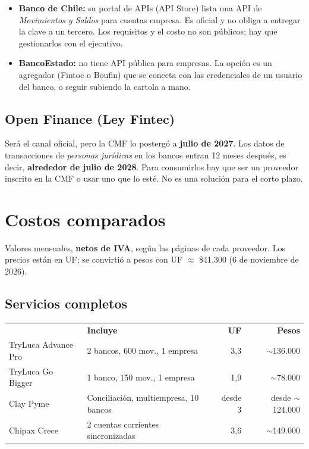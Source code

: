 \documentclass[11pt,a4paper]{article}
\newcommand{\tablahead}[1]{{\color{white}\sffamily\bfseries #1}}
\begin{document}
\begin{itemize}
  \item \textbf{Banco de Chile:} su portal de APIs (API Store) lista una API de \emph{Movimientos y Saldos} para cuentas empresa. Es oficial y no obliga a entregar la clave a un tercero. Los requisitos y el costo no son públicos; hay que gestionarlos con el ejecutivo.
  \item \textbf{BancoEstado:} no tiene API pública para empresas. La opción es un agregador (Fintoc o Boufin) que se conecta con las credenciales de un usuario del banco, o seguir subiendo la cartola a mano.
\end{itemize}

\subsection{Open Finance (Ley Fintec)}

Será el canal oficial, pero la CMF lo postergó a \textbf{julio de 2027}. Los datos de transacciones de \emph{personas jurídicas} en los bancos entran 12 meses después, es decir, \textbf{alrededor de julio de 2028}. Para consumirlos hay que ser un proveedor inscrito en la CMF o usar uno que lo esté. No es una solución para el corto plazo.

\section{Costos comparados}

Valores mensuales, \textbf{netos de IVA}, según las páginas de cada proveedor. Los precios están en UF; se convirtió a pesos con UF $\approx$ \$41.300 (6 de noviembre de 2026).

\subsection{Servicios completos}

\begin{center}
\small
\begin{tabularx}{\textwidth}{@{}L l r r@{}}
\rowcolor{azul}\tablahead{Servicio y plan} & \tablahead{Incluye} & \tablahead{UF} & \tablahead{Pesos} \\
TryLuca Advance Pro & 2 bancos, 600 mov., 1 empresa & 3,3 & $\sim$136.000 \\
TryLuca Go Bigger & 1 banco, 150 mov., 1 empresa & 1,9 & $\sim$78.000 \\
Clay Pyme & Conciliación, multiempresa, 10 bancos & desde 3 & desde $\sim$124.000 \\
Chipax Crece & 2 cuentas corrientes sincronizadas & 3,6 & $\sim$149.000 \\
\end{tabularx}
\end{center}
\end{document}

